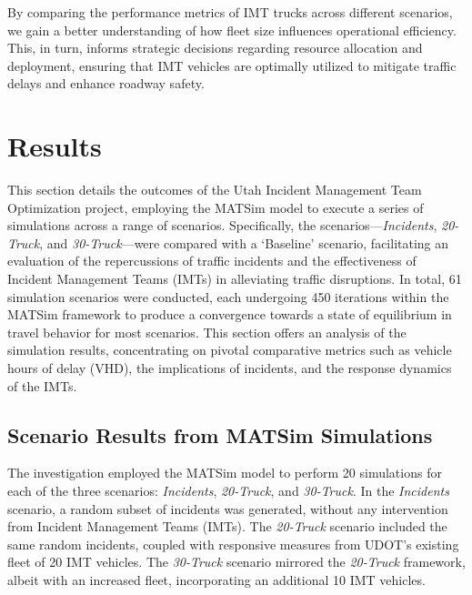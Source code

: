 \documentclass[
  letterpaper,
  authoryear]{elsarticle}
\begin{document}
By comparing the performance metrics of IMT trucks across different
scenarios, we gain a better understanding of how fleet size influences
operational efficiency. This, in turn, informs strategic decisions
regarding resource allocation and deployment, ensuring that IMT vehicles
are optimally utilized to mitigate traffic delays and enhance roadway
safety.


\hypertarget{results}{%
\section{Results}\label{results}}

This section details the outcomes of the Utah Incident Management Team
Optimization project, employing the MATSim model to execute a series of
simulations across a range of scenarios. Specifically, the
scenarios---\emph{Incidents}, \emph{20-Truck}, and
\emph{30-Truck}---were compared with a `Baseline' scenario, facilitating
an evaluation of the repercussions of traffic incidents and the
effectiveness of Incident Management Teams (IMTs) in alleviating traffic
disruptions. In total, 61 simulation scenarios were conducted, each
undergoing 450 iterations within the MATSim framework to produce a
convergence towards a state of equilibrium in travel behavior for most
scenarios. This section offers an analysis of the simulation results,
concentrating on pivotal comparative metrics such as vehicle hours of
delay (VHD), the implications of incidents, and the response dynamics of
the IMTs.

\hypertarget{scenario-results-from-matsim-simulations}{%
\subsection{Scenario Results from MATSim
Simulations}\label{scenario-results-from-matsim-simulations}}

The investigation employed the MATSim model to perform 20 simulations
for each of the three scenarios: \emph{Incidents}, \emph{20-Truck}, and
\emph{30-Truck}. In the \emph{Incidents} scenario, a random subset of
incidents was generated, without any intervention from Incident
Management Teams (IMTs). The \emph{20-Truck} scenario included the same
random incidents, coupled with responsive measures from UDOT's existing
fleet of 20 IMT vehicles. The \emph{30-Truck} scenario mirrored the
\emph{20-Truck} framework, albeit with an increased fleet, incorporating
an additional 10 IMT vehicles.
\end{document}
